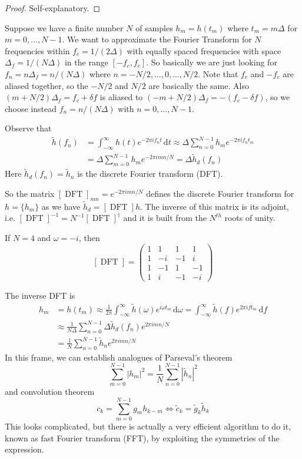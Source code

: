 \begin{proof}
    Self-explanatory.
\end{proof}
Suppose we have a finite number $N$ of samples $h_m=h(t_m)$ where $t_m=m\Delta$ for $m=0,\ldots,N-1$.
We want to approximate the Fourier Transform for $N$ frequencies within $f_c=1/(2\Delta)$ with equally spaced frequencies with space $\Delta_f=1/(N\Delta)$ in the range $[-f_c,f_c]$.
So basically we are just looking for $f_n=n\Delta_f=n/(N\Delta)$ where $n=-N/2,\ldots,0,\ldots,N/2$.
Note that $f_c$ and $-f_c$ are aliased together, so the $-N/2$ and $N/2$ are basically the same.
Also $(m+N/2)\Delta_f=f_c+\delta f$ is aliased to $(-m+N/2)\Delta_f=-(f_c-\delta f)$, so we choose instead $f_n=n/(N\Delta)$ with $n=0,\ldots,N-1$.
\begin{definition}
    Observe that
    \begin{align*}
        \tilde{h}(f_n)&=\int_{-\infty}^\infty h(t)e^{-2\pi if_nt}\,\mathrm dt\approx\Delta\sum_{n=0}^{N-1}h_me^{-2\pi i f_nt_m}\\
        &=\Delta\sum_{m=0}^{N-1}h_me^{-2\pi imn/N}=\Delta\tilde{h}_d(f_n)
    \end{align*}
    Here $\tilde{h}_d(f_n)=\tilde{h}_n$ is the discrete Fourier transform (DFT).
\end{definition}
So the matrix $[\operatorname{DFT}]_{mn}=e^{-2\pi imn/N}$ defines the discrete Fourier transform for $h=\{h_m\}$ as we have $\tilde{h}_d=[\operatorname{DFT}]h$.
The inverse of this matrix is its adjoint, i.e. $[\operatorname{DFT}]^{-1}=N^{-1}[\operatorname{DFT}]^\dagger$ and it is built from the $N^{th}$ roots of unity.
\begin{example}
    If $N=4$ and $\omega=-i$, then
    $$[\operatorname{DFT}]=\begin{pmatrix}
        1&1&1&1\\
        1&-i&-1&i\\
        1&-1&1&-1\\
        1&i&-1&-i
    \end{pmatrix}$$
\end{example}
The inverse DFT is
\begin{align*}
    h_m&=h(t_m)\approx\frac{1}{2\pi}\int_{-\infty}^\infty\tilde{h}(\omega)e^{i\omega t_m}\,\mathrm d\omega=\int_{-\infty}^\infty\tilde{h}(f)e^{2\pi ift_m}\,\mathrm df\\
    &\approx\frac{1}{N\Delta}\sum_{n=0}^{N-1}\Delta\tilde{h}_d(f_n)e^{2\pi imn/N}\\
    &=\frac{1}{N}\sum_{n=0}^{N-1}\tilde{h}_ne^{2\pi imn/N}
\end{align*}
In this frame, we can establish analogues of Parseval's theorem
$$\sum_{m=0}^{N-1}|h_m|^2=\frac{1}{N}\sum_{n=0}^{N-1}|\tilde{h}_n|^2$$
and convolution theorem
$$c_k=\sum_{m=0}^{N-1}g_mh_{k-m}\iff \tilde{c}_k=\tilde{g}_k\tilde{h}_k$$
This looks complicated, but there is actually a very efficient algorithm to do it, known as fast Fourier transform (FFT), by exploiting the symmetries of the expression.